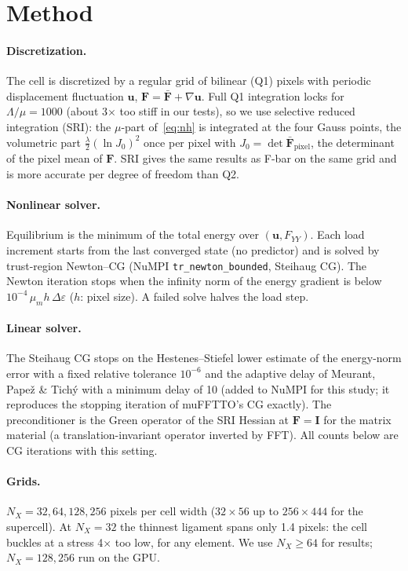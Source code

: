 \documentclass[11pt,a4paper]{article}
\begin{document}
\section{Method}

\paragraph{Discretization.} The cell is discretized by a regular grid of bilinear (Q1) pixels with periodic
displacement fluctuation $\bm u$, $\bm F = \bar{\bm F} + \nabla\bm u$. Full Q1 integration locks for
$\Lambda/\mu = 1000$ (about 3$\times$ too stiff in our tests), so we use selective reduced integration (SRI): the
$\mu$-part of~\eqref{eq:nh} is integrated at the four Gauss points, the volumetric part $\frac{\lambda}{2}(\ln J_0)^2$
once per pixel with $J_0 = \det\bar{\bm F}_{\text{pixel}}$, the determinant of the pixel mean of $\bm F$. SRI gives the
same results as F-bar on the same grid and is more accurate per degree of freedom than Q2.

\paragraph{Nonlinear solver.} Equilibrium is the minimum of the total energy over $(\bm u, F_{YY})$. Each load
increment starts from the last converged state (no predictor) and is solved by trust-region Newton--CG
(NuMPI \texttt{tr\_newton\_bounded}, Steihaug CG). The Newton iteration stops when the infinity norm of the energy
gradient is below $10^{-4}\,\mu_m h\,\Delta\varepsilon$ ($h$: pixel size). A failed solve halves the load step.

\paragraph{Linear solver.} The Steihaug CG stops on the Hestenes--Stiefel lower estimate of the energy-norm error
with a fixed relative tolerance $10^{-6}$ and the adaptive delay of Meurant, Pape\v{z} \& Tich\'y with a minimum
delay of 10 (added to NuMPI for this study; it reproduces the stopping iteration of muFFTTO's CG exactly).
The preconditioner is the Green operator of the SRI Hessian at $\bm F = \bm I$ for the matrix material
(a translation-invariant operator inverted by FFT). All counts below are CG iterations with this setting.

\paragraph{Grids.} $N_X = 32, 64, 128, 256$ pixels per cell width ($32 \times 56$ up to $256 \times 444$ for the
supercell). At $N_X = 32$ the thinnest ligament spans only 1.4 pixels: the cell buckles at a stress 4$\times$ too low,
for any element. We use $N_X \ge 64$ for results; $N_X = 128, 256$ run on the GPU.
\end{document}

